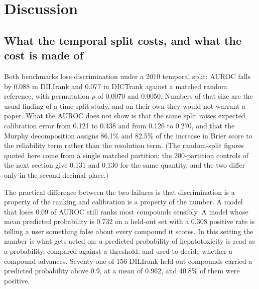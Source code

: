 
\section{Discussion}

\subsection{What the temporal split costs, and what the cost is made of}

Both benchmarks lose discrimination under a 2010 temporal split: AUROC falls by
0.088 in DILIrank and 0.077 in DICTrank against a matched random reference, with
permutation $p$ of 0.0070 and 0.0050. Numbers of that size are the usual finding
of a time-split study, and on their own they would not warrant a paper. What the
AUROC does not show is that the same split raises expected calibration error from
0.121 to 0.438 and from 0.126 to 0.270, and that the Murphy decomposition assigns
86.1\% and 82.5\% of the increase in Brier score to the reliability term rather
than the resolution term. (The random-split figures quoted here come from a single
matched partition; the 200-partition controls of the next section give 0.131 and
0.130 for the same quantity, and the two differ only in the second decimal place.)

The practical difference between the two failures is that discrimination is a
property of the ranking and calibration is a property of the number. A model that
loses 0.09 of AUROC still ranks most compounds sensibly. A model whose mean
predicted probability is 0.732 on a held-out set with a 0.308 positive rate is
telling a user something false about every compound it scores. In this setting the
number is what gets acted on: a predicted probability of hepatotoxicity is read as
a probability, compared against a threshold, and used to decide whether a compound
advances. Seventy-one of 156 DILIrank held-out compounds carried a predicted
probability above 0.9, at a mean of 0.962, and 40.8\% of them were positive.

